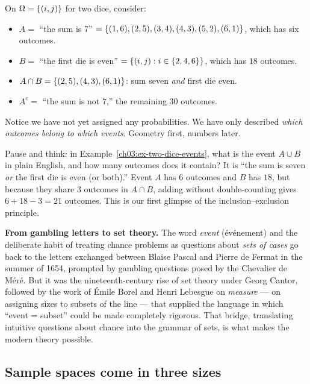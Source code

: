 \begin{example}
\label{ch03:ex-two-dice-events}
On $\Omega = \{(i,j)\}$ for two dice, consider:
\begin{itemize}
\item $A = $ ``the sum is $7$'' $= \{(1,6),(2,5),(3,4),(4,3),(5,2),(6,1)\}$,
which has six outcomes.
\item $B = $ ``the first die is even'' $= \{(i,j): i \in \{2,4,6\}\}$, which
has $18$ outcomes.
\item $A \cap B = \{(2,5),(4,3),(6,1)\}$: sum seven \emph{and} first die even.
\item $A^c = $ ``the sum is not $7$,'' the remaining $30$ outcomes.
\end{itemize}
Notice we have not yet assigned any probabilities. We have only described
\emph{which outcomes belong to which events}. Geometry first, numbers later.
\end{example}

Pause and think: in Example~\ref{ch03:ex-two-dice-events}, what is the event
$A \cup B$ in plain English, and how many outcomes does it contain? It is ``the
sum is seven \emph{or} the first die is even (or both).'' Event $A$ has $6$
outcomes and $B$ has $18$, but because they share $3$ outcomes in $A \cap B$,
adding without double-counting gives $6 + 18 - 3 = 21$ outcomes. This is our
first glimpse of the inclusion--exclusion principle.

\begin{connectionbox}
\textbf{From gambling letters to set theory.}
The word \emph{event} (\'ev\'enement) and the deliberate habit of treating chance
problems as questions about \emph{sets of cases} go back to the letters
exchanged between Blaise Pascal and Pierre de Fermat in the summer of 1654,
prompted by gambling questions posed by the Chevalier de M\'er\'e. But it was the
nineteenth-century rise of set theory under Georg Cantor, followed by the
work of \'Emile Borel and Henri Lebesgue on \emph{measure} ---
on assigning sizes to subsets of the line --- that supplied the language in which
``event = subset'' could be made completely rigorous. That bridge, translating
intuitive questions about chance into the grammar of sets, is what makes the
modern theory possible.
\end{connectionbox}

\subsection{Sample spaces come in three sizes}
\label{ch03:three-sizes}

